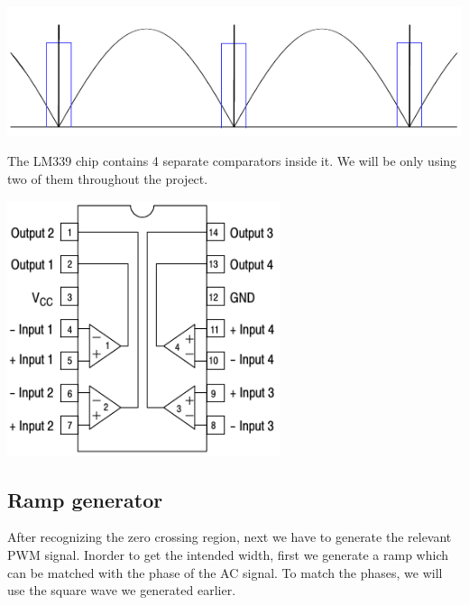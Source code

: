 \begin{multicols}{2}
\begin{minipage}{0.45\textwidth}
\centering
\includegraphics[width=\textwidth]{Method/Zero-ramp function.pdf}
\end{minipage}

The LM339 chip contains 4 separate comparators inside it. We will be only using two of them throughout the project.


\begin{minipage}{0.45\textwidth}
\centering
\includegraphics[width=0.6\textwidth]{Method/LM339.pdf}
\end{minipage}

 
 
\subsection{Ramp generator}
After recognizing the zero crossing region, next we have to generate the relevant PWM signal. Inorder to get the intended width, first we generate a ramp which can be matched with the phase of the AC signal. To match the phases, we will use the square wave we generated earlier. 



\end{multicols}
